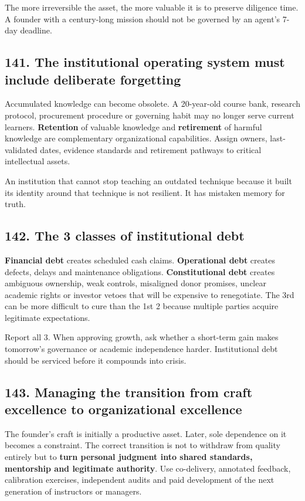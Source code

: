 The more irreversible the asset, the more valuable it is to preserve diligence time. A founder with a century-long mission should not be governed by an agent's 7-day deadline.

\subsection{141. The institutional operating system must include deliberate forgetting}

Accumulated knowledge can become obsolete. A 20-year-old course bank, research protocol, procurement procedure or governing habit may no longer serve current learners. \textbf{Retention} of valuable knowledge and \textbf{retirement} of harmful knowledge are complementary organizational capabilities. Assign owners, last-validated dates, evidence standards and retirement pathways to critical intellectual assets.

An institution that cannot stop teaching an outdated technique because it built its identity around that technique is not resilient. It has mistaken memory for truth.

\subsection{142. The 3 classes of institutional debt}

\textbf{Financial debt} creates scheduled cash claims. \textbf{Operational debt} creates defects, delays and maintenance obligations. \textbf{Constitutional debt} creates ambiguous ownership, weak controls, misaligned donor promises, unclear academic rights or investor vetoes that will be expensive to renegotiate. The 3rd can be more difficult to cure than the 1st 2 because multiple parties acquire legitimate expectations.

Report all 3. When approving growth, ask whether a short-term gain makes tomorrow's governance or academic independence harder. Institutional debt should be serviced before it compounds into crisis.

\subsection{143. Managing the transition from craft excellence to organizational excellence}

The founder's craft is initially a productive asset. Later, sole dependence on it becomes a constraint. The correct transition is not to withdraw from quality entirely but to \textbf{turn personal judgment into shared standards, mentorship and legitimate authority}. Use co-delivery, annotated feedback, calibration exercises, independent audits and paid development of the next generation of instructors or managers.

